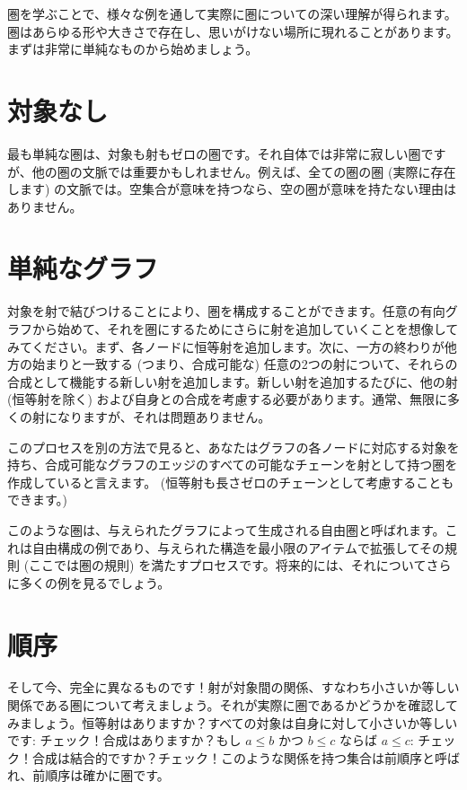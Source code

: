 
\lettrine[lhang=0.17]{圏}{を}学ぶことで、様々な例を通して実際に圏についての深い理解が得られます。圏はあらゆる形や大きさで存在し、思いがけない場所に現れることがあります。まずは非常に単純なものから始めましょう。

\section{対象なし}

最も単純な圏は、対象も射もゼロの圏です。それ自体では非常に寂しい圏ですが、他の圏の文脈では重要かもしれません。例えば、全ての圏の圏 (実際に存在します) の文脈では。空集合が意味を持つなら、空の圏が意味を持たない理由はありません。

\section{単純なグラフ}

対象を射で結びつけることにより、圏を構成することができます。任意の有向グラフから始めて、それを圏にするためにさらに射を追加していくことを想像してみてください。まず、各ノードに恒等射を追加します。次に、一方の終わりが他方の始まりと一致する (つまり、合成可能な) 任意の2つの射について、それらの合成として機能する新しい射を追加します。新しい射を追加するたびに、他の射 (恒等射を除く) および自身との合成を考慮する必要があります。通常、無限に多くの射になりますが、それは問題ありません。

このプロセスを別の方法で見ると、あなたはグラフの各ノードに対応する対象を持ち、合成可能なグラフのエッジのすべての可能なチェーンを射として持つ圏を作成していると言えます。 (恒等射も長さゼロのチェーンとして考慮することもできます。) 

このような圏は、与えられたグラフによって生成される自由圏と呼ばれます。これは自由構成の例であり、与えられた構造を最小限のアイテムで拡張してその規則 (ここでは圏の規則) を満たすプロセスです。将来的には、それについてさらに多くの例を見るでしょう。

\section{順序}

そして今、完全に異なるものです！射が対象間の関係、すなわち小さいか等しい関係である圏について考えましょう。それが実際に圏であるかどうかを確認してみましょう。恒等射はありますか？すべての対象は自身に対して小さいか等しいです: チェック！合成はありますか？もし \(a \leqslant b\) かつ \(b \leqslant c\) ならば \(a \leqslant c\): チェック！合成は結合的ですか？チェック！このような関係を持つ集合は前順序と呼ばれ、前順序は確かに圏です。


